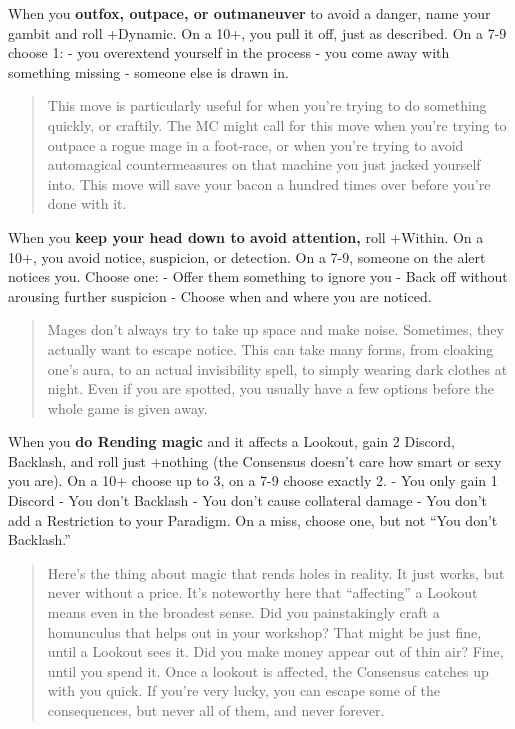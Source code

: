 \documentclass[
  oneside,
  statementpaper,
  9pt]{memoir}
\begin{document}
When you \textbf{outfox, outpace, or outmaneuver} to avoid a danger,
name your gambit and roll +Dynamic. On a 10+, you pull it off, just as
described. On a 7-9 choose 1: - you overextend yourself in the process -
you come away with something missing - someone else is drawn in.

\begin{quote}
This move is particularly useful for when you're trying to do something
quickly, or craftily. The MC might call for this move when you're trying
to outpace a rogue mage in a foot-race, or when you're trying to avoid
automagical countermeasures on that machine you just jacked yourself
into. This move will save your bacon a hundred times over before you're
done with it.
\end{quote}

When you \textbf{keep your head down to avoid attention,} roll +Within.
On a 10+, you avoid notice, suspicion, or detection. On a 7-9, someone
on the alert notices you. Choose one: - Offer them something to ignore
you - Back off without arousing further suspicion - Choose when and
where you are noticed.

\begin{quote}
Mages don't always try to take up space and make noise. Sometimes, they
actually want to escape notice. This can take many forms, from cloaking
one's aura, to an actual invisibility spell, to simply wearing dark
clothes at night. Even if you are spotted, you usually have a few
options before the whole game is given away.
\end{quote}

When you \textbf{do Rending magic} and it affects a Lookout, gain 2
Discord, Backlash, and roll just +nothing (the Consensus doesn't care
how smart or sexy you are). On a 10+ choose up to 3, on a 7-9 choose
exactly 2. - You only gain 1 Discord - You don't Backlash - You don't
cause collateral damage - You don't add a Restriction to your Paradigm.
On a miss, choose one, but not ``You don't Backlash.''

\begin{quote}
Here's the thing about magic that rends holes in reality. It just works,
but never without a price. It's noteworthy here that ``affecting'' a
Lookout means even in the broadest sense. Did you painstakingly craft a
homunculus that helps out in your workshop? That might be just fine,
until a Lookout sees it. Did you make money appear out of thin air?
Fine, until you spend it. Once a lookout is affected, the Consensus
catches up with you quick. If you're very lucky, you can escape some of
the consequences, but never all of them, and never forever.
\end{quote}
\end{document}
